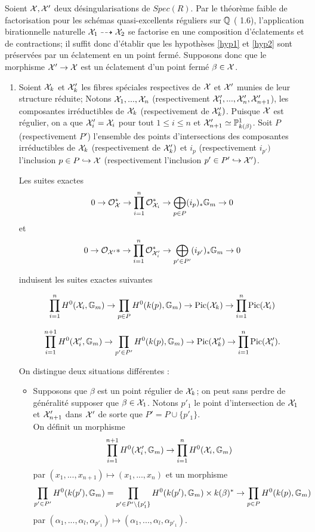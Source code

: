 \documentclass[11pt]{article}
\begin{document}
\proof Soient $\mathcal{X}, \mathcal{X}'$ deux désingularisations de $Spec(R)$. Par le théorème faible de factorisation pour les schémas quasi-excellents réguliers sur $\mathbb{Q}$ (\cite{AbTe19} 1.6), l'application birationnelle naturelle $\mathcal{X}_1 \dashrightarrow \mathcal{X}_2$ se factorise en une composition d'éclatements et de contractions; il suffit donc d'établir que les hypothèses \ref{hyp1} et \ref{hyp2} sont préservées par un éclatement en un point fermé. Supposons donc que le morphisme $\mathcal{X}' \rightarrow \mathcal{X}$ est un éclatement d'un point fermé $\beta \in \mathcal{X}$.
\begin{enumerate}[label= \roman*)]

    \item Soient $\mathcal{X}_k$ et $\mathcal{X}'_k$ les fibres spéciales respectives de $\mathcal{X}$ et $\mathcal{X}'$ munies de leur structure réduite;  Notons $\mathcal{X}_1,...,\mathcal{X}_n$ (respectivement $\mathcal{X}_1',...,\mathcal{X}_n', \mathcal{X}_{n+1}'$), les composantes irréductibles de $\mathcal{X}_k$ (respectivement de $\mathcal{X}_k')$. Puisque $\mathcal{X}$ est régulier, on a que $\mathcal{X}_i' = \mathcal{X}_i$ pour tout $1 \leq i \leq n$ et $\mathcal{X}_{n+1}' \simeq \mathbb{P}^1_{k(\beta)}$.
    Soit $P$ (respectivement $P'$) l'ensemble des points d'intersections des composantes irréductibles de $\mathcal{X}_k$ (respectivement de $\mathcal{X}'_k)$ et $i_p$ (respectivement $i_{p'})$ l'inclusion $p \in P\hookrightarrow \mathcal{X}$ (respectivement l'inclusion $p' \in P'\hookrightarrow \mathcal{X}')$. 

Les suites exactes 
$$
    0 \rightarrow \mathcal{O}_{\mathcal{X}}^* \rightarrow \prod_{i=1}^n \mathcal{O}_{\mathcal{X}_i}^* \rightarrow \bigoplus_{p \in P} (i_p)_*\mathbb{G}_m \rightarrow 0
$$
et
$$
    0 \rightarrow \mathcal{O}_{\mathcal{X}'}* \rightarrow \prod_{i=1}^n \mathcal{O}_{\mathcal{X}'_i}^* \rightarrow \bigoplus_{p' \in P'} (i_{p'})_*\mathbb{G}_m \rightarrow 0
$$

induisent les suites exactes suivantes 

\begin{equation}\label{eqsuite1}
\prod_{i=1}^n H^0(\mathcal{X}_i, \mathbb{G}_m) \rightarrow \prod_{p \in P} H^0(k(p), \mathbb{G}_m) \rightarrow \operatorname{Pic}(\mathcal{X}_k) \rightarrow \prod_{i=1}^n \operatorname{Pic}(\mathcal{X}_i)
\end{equation}

\begin{equation}\label{eqsuite2}
 \prod_{i=1}^{n+1} H^0(\mathcal{X}'_i, \mathbb{G}_m) \rightarrow \prod_{p' \in P'} H^0(k(p), \mathbb{G}_m) \rightarrow \operatorname{Pic}(\mathcal{X}'_k) \rightarrow \prod_{i=1}^n \operatorname{Pic}(\mathcal{X}'_i).
\end{equation}

On distingue deux situations différentes :

\begin{itemize}
    \item Supposons que $\beta$ est un point régulier de $\mathcal{X}_k$; on peut sans perdre de généralité supposer que $\beta \in\mathcal{X}_1$. Notons $p'_1$ le point d'intersection de $\mathcal{X}_1$ et $\mathcal{X}'_{n+1}$ dans $\mathcal{X}'$ de sorte que $P' = P \cup \{p'_1\}$.\\
On définit un morphisme $$\prod_{i=1}^{n+1} H^0(\mathcal{X}'_i, \mathbb{G}_m) \rightarrow \prod_{i=1}^n H^0(\mathcal{X}_i, \mathbb{G}_m)$$  par $(x_1,...,x_{n+1}) \mapsto (x_1,...,x_n)$ et un morphisme
$$\prod_{p' \in P'} H^0(k(p'), \mathbb{G}_m) = \prod_{p' \in P' \setminus\{p'_1\}} H^0(k(p'), \mathbb{G}_m) \times k(\beta)^* \rightarrow \prod_{p \in P} H^0(k(p), \mathbb{G}_m)$$
par $(\alpha_1,...,\alpha_l,\alpha_{p'_1}) \mapsto (\alpha_1,...,\alpha_l,\alpha_{p'_1})$.


\end{itemize}
\end{enumerate}
\end{document}
